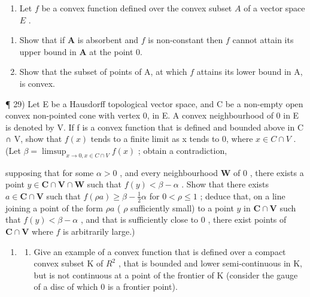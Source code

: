 \begin{enumerate}
\def\labelenumi{\arabic{enumi})}
\setcounter{enumi}{27}
\tightlist
\item
  Let \(f\) be a convex function defined over the convex subset \(A\) of a vector space \(E\) .
\end{enumerate}

\begin{enumerate}
\def\labelenumi{\alph{enumi})}
\item
  Show that if \(\mathbf{A}\) is absorbent and \(f\) is non-constant then \(f\) cannot attain its upper bound in \(\mathbf{A}\) at the point 0.
\item
  Show that the subset of points of A, at which \(f\) attains its lower bound in A, is convex.
\end{enumerate}

¶ 29) Let E be a Hausdorff topological vector space, and C be a non-empty open convex non-pointed cone with vertex 0, in E. A convex neighbourhood of 0 in E is denoted by V. If f is a convex function that is defined and bounded above in C ∩ V, show that \(f(x)\) tends to a finite limit as x tends to 0, where \(x \in C \cap V\) . (Let \(\beta = \limsup_{x \to 0, x \in C \cap V} f(x)\) ; obtain a contradiction,

supposing that for some \(\alpha > 0\) , and every neighbourhood \(\mathbf{W}\) of \(0\) , there exists a point \(y \in \mathbf{C} \cap \mathbf{V} \cap \mathbf{W}\) such that \(f(y) < \beta - \alpha\) . Show that there exists \(a \in \mathbf{C} \cap \mathbf{V}\) such that \(f(\rho a) \geqslant \beta - \frac{1}{2}\alpha\) for \(0 < \rho \leqslant 1\) ; deduce that, on a line joining a point of the form \(\rho a\) ( \(\rho\) sufficiently small) to a point \(y\) in \(\mathbf{C} \cap \mathbf{V}\) such that \(f(y) < \beta - \alpha\) , and that is sufficiently close to \(0\) , there exist points of \(\mathbf{C} \cap \mathbf{V}\) where \(f\) is arbitrarily large.)

\begin{enumerate}
\def\labelenumi{\arabic{enumi})}
\setcounter{enumi}{29}
\tightlist
\item
  \begin{enumerate}
  \def\labelenumii{\alph{enumii})}
  \tightlist
  \item
    Give an example of a convex function that is defined over a compact convex subset K of \(R^{2}\) , that is bounded and lower semi-continuous in K, but is not continuous at a point of the frontier of K (consider the gauge of a disc of which 0 is a frontier point).
  \end{enumerate}
\end{enumerate}

